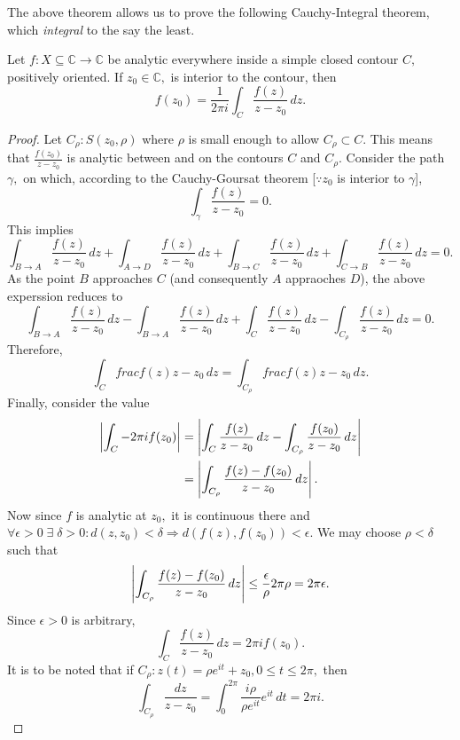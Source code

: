 \documentclass[12pt]{book}
\begin{document}
The above theorem allows us to prove the following Cauchy-Integral theorem, which \textit{integral} to the say the least. 
\begin{thm}
    Let $f: X \subseteq \mathbb{C} \rightarrow \mathbb{C}$ be analytic everywhere inside a simple closed contour $C,$ positively oriented. If $z_0 \in \mathbb{C},$ is interior to the contour, then 
    \[
        f(z_0) = \frac{1}{2\pi i} \int_{C} \frac{f(z)}{z - z_0}\,dz.
    \]
\end{thm}
\begin{proof}
    Let $C_{\rho}: S(z_0, \rho)$ where $\rho$ is small enough to allow $C_{\rho} \subset C.$ This means that $\frac{f(z_0)}{z - z_0}$ is analytic between and on the contours $C$ and $C_{\rho}.$ Consider the path $\gamma,$ on which, according to the Cauchy-Goursat theorem [$\because z_0$ is interior to $\gamma$], 
    \[
        \int_{\gamma} \frac{f(z)}{z - z_0} = 0.
    \]
    This implies
    \[
        \int_{B \rightarrow A} \frac{f(z)}{z - z_0}\,dz + \int_{A \rightarrow D} \frac{f(z)}{z - z_0}\,dz + \int_{B\rightarrow C} \frac{f(z)}{z - z_0}\,dz + \int_{C \rightarrow B} \frac{f(z)}{z - z_0}\,dz = 0.
    \]
    As the point $B$ approaches $C$ (and consequently $A$ appraoches $D$), the above experssion reduces to  
    \[
        \int_{B \rightarrow A} \frac{f(z)}{z - z_0}\,dz - \int_{B \rightarrow A} \frac{f(z)}{z - z_0}\,dz + \int_{C} \frac{f(z)}{z - z_0}\,dz - \int_{C_{\rho}} \frac{f(z)}{z - z_0}\,dz = 0.
    \]
    Therefore,
    \[
        \int_{C} frac{f(z)}{z - z_0}\,dz = \int_{C_{\rho}} frac{f(z)}{z - z_0}\,dz.
    \]
    Finally, consider the value
    \begin{align*}
        \left\lvert \int_{C} - 2\pi i f(z_0) \right\rvert
            &=
                \left\lvert \int_{C} \frac{f(z)}{z - z_0}\,dz - \int_{C_{\rho}}\frac{f(z_0)}{z - z_0}\,dz \right\rvert \\
            &=
                \left\lvert \int_{C_{\rho}}\frac{f(z) - f(z_0)}{z - z_0}\,dz \right\rvert.
    \end{align*}
    Now since $f$ is analytic at $z_0,$ it is continuous there and $\forall \epsilon > 0 \;\exists\; \delta > 0: d(z, z_0) < \delta \Rightarrow d(f(z), f(z_0)) < \epsilon.$ We may choose $\rho < \delta$ such that 
    \[
        \left\lvert \int_{C_{\rho}}\frac{f(z) - f(z_0)}{z - z_0}\,dz \right\rvert \leq \frac{\epsilon}{\rho} 2\pi\rho = 2\pi \epsilon.
    \]
    Since $\epsilon > 0$ is arbitrary,
    \[
        \int_{C} \frac{f(z)}{z - z_0}\,dz = 2\pi i f(z_0).
    \]
    It is to be noted that if $C_{\rho}: z(t) = \rho e^{it} + z_0, 0 \leq t \leq 2\pi,$ then
    \[
        \int_{C_{\rho}} \frac{dz}{z - z_0} = \int_{0}^{2\pi}\frac{i\rho}{\rho e^{it}}e^{it}\,dt = 2\pi i.
    \]
\end{proof}
\end{document}
